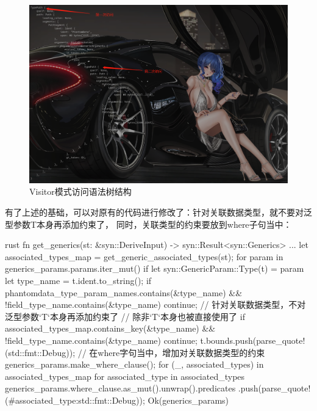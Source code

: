 \begin{figure}[H]
  \centering
  \includegraphics[width=\linewidth]{rust_syn_visitor.png}
  \caption{Visitor模式访问语法树结构}
  \label{fig:rust_syn_visitor}
\end{figure}

有了上述的基础，可以对原有的代码进行修改了：针对关联数据类型，就不要对泛型参数T本身再添加约束了，
同时，关联类型的约束要放到where子句当中：
\begin{code-block}{rust}
fn get_generics(st: &syn::DeriveInput) -> syn::Result<syn::Generics> {
    ...
    let associated_types_map = get_generic_associated_types(st);
    for param in generics_params.params.iter_mut() {
        if let syn::GenericParam::Type(t) = param {
            let type_name = t.ident.to_string();
            if phantomdata_type_param_names.contains(&type_name)
                && !field_type_name.contains(&type_name)
            {
                continue;
            }
            // 针对关联数据类型，不对泛型参数`T`本身再添加约束了
            // 除非`T`本身也被直接使用了
            if associated_types_map.contains_key(&type_name)
                && !field_type_name.contains(&type_name)
            {
                continue;
            }
            t.bounds.push(parse_quote!(std::fmt::Debug));
        }
    }
    // 在where字句当中，增加对关联数据类型的约束
    generics_params.make_where_clause();
    for (_, associated_types) in associated_types_map {
        for associated_type in associated_types {
            generics_params.where_clause.as_mut().unwrap().predicates
                .push(parse_quote!(#associated_type:std::fmt::Debug));
        }
    }
    Ok(generics_params)
}
\end{code-block}

